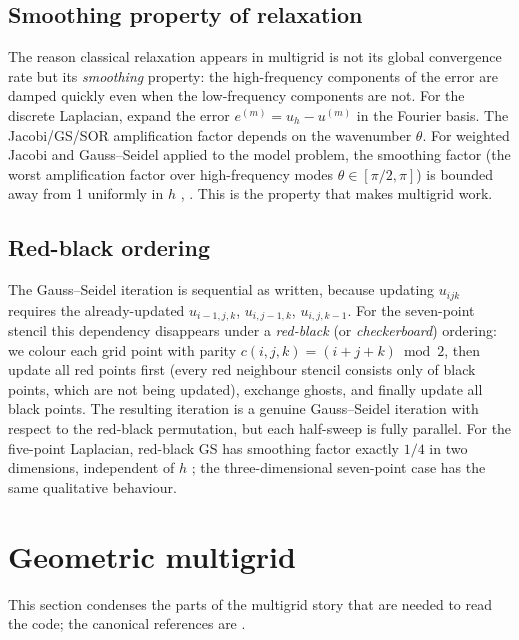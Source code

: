\documentclass[11pt]{article}
\theoremstyle{definition}
\begin{document}
\subsection{Smoothing property of relaxation}\label{sec:smoothing-property}
The reason classical relaxation appears in multigrid is not its global
convergence rate but its \emph{smoothing} property: the high-frequency
components of the error are damped quickly even when the low-frequency
components are not.  For the discrete Laplacian, expand the error
$e^{(m)} = u_h - u^{(m)}$ in the Fourier basis.  The Jacobi/GS/SOR
amplification factor depends on the wavenumber $\theta$.  For
weighted Jacobi and Gauss--Seidel applied to the model problem, the
smoothing factor (the worst amplification factor over high-frequency
modes $\theta\in[\pi/2,\pi]$) is bounded away from 1 uniformly in $h$
\cite[\S2.1]{trottenberg2001multigrid},
\cite[\S3.2]{briggs2000multigrid}.  This is the property that makes
multigrid work.

\subsection{Red-black ordering}\label{sec:redblack}
The Gauss--Seidel iteration is sequential as written, because updating
$u_{ijk}$ requires the already-updated $u_{i-1,j,k}$, $u_{i,j-1,k}$,
$u_{i,j,k-1}$.  For the seven-point stencil this dependency disappears
under a \emph{red-black} (or \emph{checkerboard}) ordering: we colour
each grid point with parity $c(i,j,k)= (i+j+k)\bmod 2$, then update
all red points first (every red neighbour stencil consists only of
black points, which are not being updated), exchange ghosts, and
finally update all black points.  The resulting iteration is a
genuine Gauss--Seidel iteration with respect to the red-black
permutation, but each half-sweep is fully parallel.  For the
five-point Laplacian, red-black GS has smoothing factor exactly $1/4$
in two dimensions, independent of $h$
\cite[\S3.2]{trottenberg2001multigrid}; the three-dimensional
seven-point case has the same qualitative behaviour.

\section{Geometric multigrid}\label{sec:multigrid}

This section condenses the parts of the multigrid story that are needed to
read the code; the canonical references are
\cite{briggs2000multigrid,trottenberg2001multigrid,hackbusch1985multi}.
\end{document}
